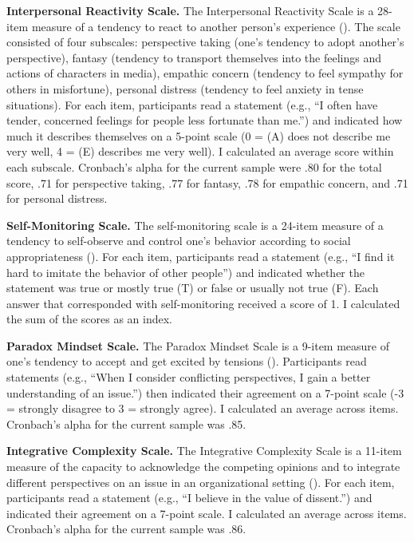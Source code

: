 \documentclass[
]{udthesis}
\begin{document}
\textbf{Interpersonal Reactivity Scale.} The Interpersonal Reactivity Scale is a 28-item measure of a tendency to react to another person's experience (). The scale consisted of four subscales: perspective taking (one's tendency to adopt another's perspective), fantasy (tendency to transport themselves into the feelings and actions of characters in media), empathic concern (tendency to feel sympathy for others in misfortune), personal distress (tendency to feel anxiety in tense situations). For each item, participants read a statement (e.g., ``I often have tender, concerned feelings for people less fortunate than me.'') and indicated how much it describes themselves on a 5-point scale (0 = (A) does not describe me very well, 4 = (E) describes me very well). I calculated an average score within each subscale. Cronbach's alpha for the current sample were .80 for the total score, .71 for perspective taking, .77 for fantasy, .78 for empathic concern, and .71 for personal distress.

\textbf{Self-Monitoring Scale.} The self-monitoring scale is a 24-item measure of a tendency to self-observe and control one's behavior according to social appropriateness (). For each item, participants read a statement (e.g., ``I find it hard to imitate the behavior of other people'') and indicated whether the statement was true or mostly true (T) or false or usually not true (F). Each answer that corresponded with self-monitoring received a score of 1. I calculated the sum of the scores as an index.

\textbf{Paradox Mindset Scale.} The Paradox Mindset Scale is a 9-item measure of one's tendency to accept and get excited by tensions (). Participants read statements (e.g., ``When I consider conflicting perspectives, I gain a better understanding of an issue.'') then indicated their agreement on a 7-point scale (-3 = strongly disagree to 3 = strongly agree). I calculated an average across items. Cronbach's alpha for the current sample was .85.

\textbf{Integrative Complexity Scale.} The Integrative Complexity Scale is a 11-item measure of the capacity to acknowledge the competing opinions and to integrate different perspectives on an issue in an organizational setting (). For each item, participants read a statement (e.g., ``I believe in the value of dissent.'') and indicated their agreement on a 7-point scale. I calculated an average across items. Cronbach's alpha for the current sample was .86.
\end{document}
